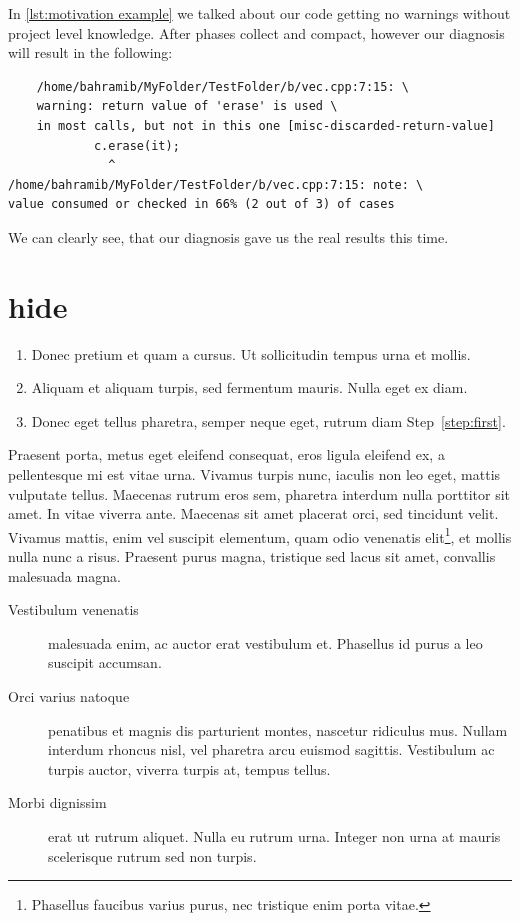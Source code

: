 In \cref{lst:motivation example} we talked about our code getting no warnings without project level knowledge.
After phases collect and compact, however our diagnosis will result in the following:

\begin{lstlisting}
	/home/bahramib/MyFolder/TestFolder/b/vec.cpp:7:15: \
	warning: return value of 'erase' is used \
	in most calls, but not in this one [misc-discarded-return-value]
            c.erase(it);
              ^
/home/bahramib/MyFolder/TestFolder/b/vec.cpp:7:15: note: \
value consumed or checked in 66% (2 out of 3) of cases
\end{lstlisting}

We can clearly see, that our diagnosis gave us the real results this time.
















\iffalse
\chapter{hide}
		\begin{enumerate}
			\item\label{step:first} Donec pretium et quam a cursus. Ut sollicitudin tempus urna et mollis.
			\item Aliquam et aliquam turpis, sed fermentum mauris. Nulla eget ex diam.
			\item Donec eget tellus pharetra, semper neque eget, rutrum diam Step~\ref{step:first}.
		\end{enumerate}

		Praesent porta, metus eget eleifend consequat, eros ligula eleifend ex, a pellentesque mi est vitae urna. Vivamus turpis nunc, iaculis non leo eget, mattis vulputate tellus. Maecenas rutrum eros sem, pharetra interdum nulla porttitor sit amet. In vitae viverra ante. Maecenas sit amet placerat orci, 
		sed tincidunt velit. Vivamus mattis, enim vel suscipit elementum, quam odio venenatis elit\footnote{Phasellus faucibus varius purus, nec tristique enim porta vitae.}, et mollis nulla nunc a risus. Praesent purus magna, tristique sed lacus sit amet, convallis malesuada magna. 

		\begin{description}
			\item[Vestibulum venenatis] malesuada enim, ac auctor erat vestibulum et. Phasellus id purus a leo suscipit accumsan.
			\item[Orci varius natoque] penatibus et magnis dis parturient montes, nascetur ridiculus mus. Nullam interdum rhoncus nisl, vel pharetra arcu euismod sagittis. Vestibulum ac turpis auctor, viverra turpis at, tempus tellus.
			\item[Morbi dignissim] erat ut rutrum aliquet. Nulla eu rutrum urna. Integer non urna at mauris scelerisque rutrum sed non turpis.
		\end{description}

